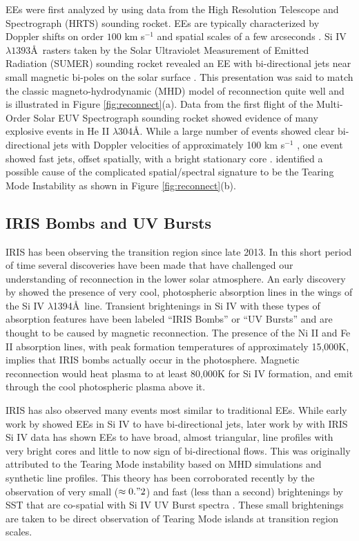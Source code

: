 \documentclass[]{aastex6}
\begin{document}
	
	EEs were first analyzed by \citet{Brueckner1983} using data from the High Resolution Telescope and Spectrograph (HRTS) sounding rocket. EEs are typically characterized by Doppler shifts on order $100$ km s$^{-1}$ and spatial scales of a few arcseconds \citep{Dere1989,Dere1994}.  Si {\sc IV} $\lambda 1393$\AA\ rasters taken by the Solar Ultraviolet Measurement of Emitted Radiation (SUMER) sounding rocket revealed an EE with bi-directional jets near small magnetic bi-poles on the solar surface \citep{Innes1997}.  This presentation was said to match the classic magneto-hydrodynamic (MHD) model of reconnection \citep{Petschek1964} quite well and is illustrated in Figure \ref{fig:reconnect}(a). Data from the first flight of the Multi-Order Solar EUV Spectrograph \citep[MOSES;][]{Fox2010} sounding rocket showed evidence of many explosive events in He II $\lambda$304\AA. While a large number of events showed clear bi-directional jets with Doppler velocities of approximately 100 km s$^{-1}$ \citep{Rust2017}, one event showed fast jets, offset spatially, with a bright stationary core \citep{Fox2010}.  \citet{Fox2010} identified a possible cause of the complicated spatial/spectral signature to be the Tearing Mode Instability \citep{Furth1963} as shown in Figure \ref{fig:reconnect}(b).
	
	\subsection{IRIS Bombs and UV Bursts}
	IRIS has been observing the transition region since late 2013.  In this short period of time several discoveries have been made that have challenged our understanding of reconnection in the lower solar atmosphere.  An early discovery by \citet{Peter2014} showed the presence of very cool, photospheric absorption lines in the wings of the Si IV $\lambda$1394\AA\ line. Transient brightenings in Si IV with these types of absorption features have been labeled ``IRIS Bombs'' or ``UV Bursts'' and are thought to be caused by magnetic reconnection. The presence of the Ni II and Fe II absorption lines, with peak formation temperatures of approximately 15,000K, implies that IRIS bombs actually occur in the photosphere.  Magnetic reconnection would heat plasma to at least 80,000K for Si IV formation, and emit through the cool photospheric plasma above it.
	
	IRIS has also observed many events most similar to traditional EEs.  While early work by \citet{Innes1997} showed EEs in Si IV to have bi-directional jets, later work by \citet{Innes2015} with IRIS Si IV data has shown EEs to have broad, almost triangular, line profiles with very bright cores and little to now sign of bi-directional flows.  This was originally attributed to the Tearing Mode instability based on MHD simulations and synthetic line profiles. This theory has been corroborated recently by the observation of very small ($\approx 0."2$) and fast (less than a second) brightenings by SST that are co-spatial with Si IV UV Burst spectra \citep{Rouppe2017}.  These small brightenings are taken to be direct observation of Tearing Mode islands at transition region scales.
	
\end{document}
